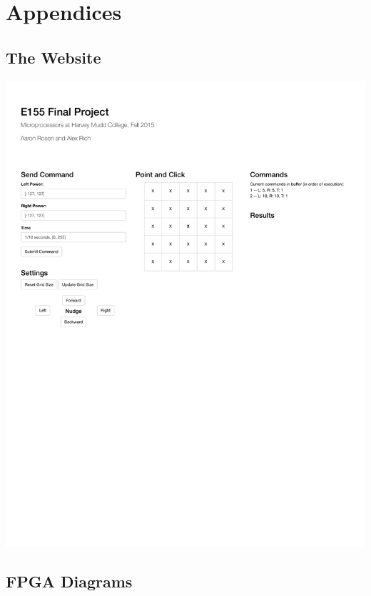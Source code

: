 \documentclass[12pt]{article}
\begin{document}
\section{Appendices}

\subsection{The Website}
\label{sec:web}

\includegraphics[width=\textwidth]{website}


\subsection{FPGA Diagrams}
\end{document}
